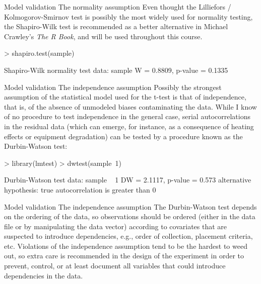 \documentclass[t]{beamer}
\begin{document}

\begin{ftstf}
{Model validation}
{The normality assumption}
Even thought the Lilliefors / Kolmogorov-Smirnov test is possibly the most widely used for normality testing, the Shapiro-Wilk test is recommended as a better alternative in Michael Crawley's \textit{The R Book}, and will be used throughout this course.
\vhalf
\begin{rcode}
> shapiro.test(sample)

Shapiro-Wilk normality test
data:  sample
W = 0.8809, p-value = 0.1335
\end{rcode}
\end{ftstf}


\begin{ftstf}
{Model validation}
{The independence assumption}
Possibly the strongest assumption of the statistical model used for the t-test is that of independence, that is, of the absence of unmodeled biases contaminating the data.
\vhalf
While I know of no procedure to test independence in the general case, serial autocorrelations in the residual data (which can emerge, for instance, as a consequence of heating effects or equipment degradation) can be tested by a procedure known as the Durbin-Watson test:
\begin{rcode}
> library(lmtest)
> dwtest(sample~1)

Durbin-Watson test
data:  sample ~ 1
DW = 2.1117, p-value = 0.573
alternative hypothesis: true autocorrelation is greater than 0
\end{rcode}
\end{ftstf}


\begin{ftstf}
{Model validation}
{The independence assumption}
The Durbin-Watson test depends on the ordering of the data, so observations should be ordered (either in the data file or by manipulating the data vector) according to covariates that are suspected to introduce dependencies, e.g., order of collection, placement criteria, etc.
\vone
Violations of the independence assumption tend to be the hardest to weed out, so extra care is recommended in the design of the experiment in order to prevent, control, or at least document all variables that could introduce dependencies in the data.
\end{ftstf}
\end{document}
